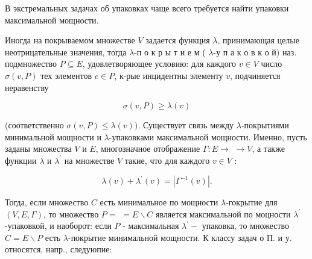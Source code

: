 \documentclass[10pt]{article}
\begin{document}
В экстремальных задачах об упаковках чаще всего требуется найти упаковки максимальной мощности.



Иногда на покрываемом множестве $V$ задается функция $\lambda$, принимающая целые неотрицательные значения, тогда $\lambda$-п о к р ы т и е м ( $\lambda$-у п а к о в к о й) наз. подмножество $P \subseteq E$, удовлетворяющее условию: для каждого $v \in V$ число $\sigma(v, P)$ тех элементов $e \in P$, к-рые инцидентны элементу $v$, подчиняется неравенству



\[

\sigma(v, P) \geqslant \lambda(v)

\]



(соответственно $\sigma(v, P) \leqslant \lambda(v))$. Существует связь между $\lambda$-покрытиями минимальной мощности и $\lambda$-упаковками максимальной мощности. Именно, пусть заданы множества $V$ и $E$, многозначное отображение $\Gamma: E \rightarrow$ $\rightarrow V$, а также функции $\lambda$ и $\lambda^{\prime}$ на множестве $V$ такие, что для каждого $v \in V$ :



\[

\lambda(v)+\lambda^{\prime}(v)=\left|\Gamma^{-1}(v)\right| .

\]



Тогда, если множество $C$ есть минимальное по мощности $\lambda$-гокрытие для $(V, E, \Gamma)$, то множество $P=$ $=E \backslash C$ является максимальной по моцности $\lambda^{\prime}$-упаковкой, и наоборот: если $P$ - максимальная $\lambda^{\prime}-$ упаковка, то множество $C=E \backslash P$ есть $\lambda$-покрытие минимальной мощности. К классу задач о П. и у. относятся, напр., следуюпие:
\end{document}
